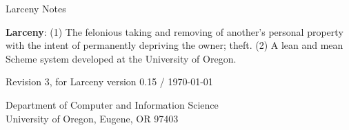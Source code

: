 


\vspace{.5in}
\centerline{\Huge Larceny Notes}
\vspace{0.75in}


{\raggedright
{\bf Larceny}: (1) The felonious taking and removing of another's 
personal property with the intent of permanently depriving the owner; theft.
(2) A lean and mean Scheme system developed at the University of Oregon.
}

\vspace{1in}
\centerline{Revision 3, for Larceny version 0.15 / \today}
\vspace{3in}
\begin{center}
Department of Computer and Information Science \\
University of Oregon, Eugene, OR 97403
\end{center}

